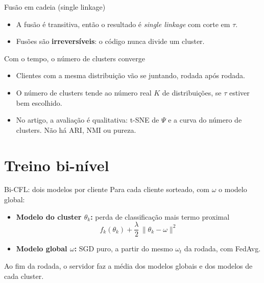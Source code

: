 \documentclass[aspectratio=169]{beamer}
\begin{document}
\begin{frame}{Fusão em cadeia (single linkage)}
  \begin{center}
  \end{center}
  \vspace{0.2em}
  \begin{itemize}
    \item A fusão é transitiva, então o resultado é \emph{single linkage} com corte em $\tau$.
    \item Fusões são \textbf{irreversíveis}: o código nunca divide um cluster.
  \end{itemize}
\end{frame}

\begin{frame}{Com o tempo, o número de clusters converge}
  \begin{itemize}
    \item Clientes com a mesma distribuição vão se juntando, rodada após rodada.
    \item O número de clusters tende ao número real $K$ de distribuições, se $\tau$ estiver bem escolhido.
    \item No artigo, a avaliação é qualitativa: t-SNE de $\Psi$ e a curva do número de clusters.
      Não há ARI, NMI ou pureza.
  \end{itemize}
\end{frame}

\section{Treino bi-nível}

\begin{frame}{Bi-CFL: dois modelos por cliente}
  Para cada cliente sorteado, com $\omega$ o modelo global:
  \begin{itemize}
    \item \textbf{Modelo do cluster $\theta_k$:} perda de classificação mais termo proximal
      \[
        f_k(\theta_k) + \frac{\lambda}{2}\,\|\theta_k - \omega\|^2
      \]
    \item \textbf{Modelo global $\omega$:} SGD puro, a partir do mesmo $\omega_t$ da rodada, com FedAvg.
  \end{itemize}
  \vspace{0.4em}
  Ao fim da rodada, o servidor faz a média dos modelos globais e dos modelos de cada cluster.
\end{frame}
\end{document}
